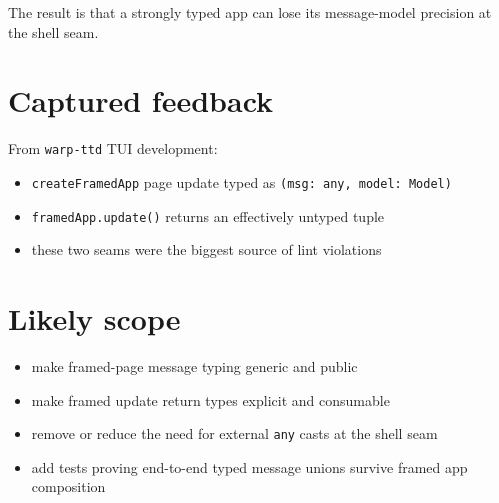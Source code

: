 The result is that a strongly typed app can lose its message-model precision at the shell seam.

\section{Captured feedback}\label{record-120-captured-feedback}

From \texttt{w\allowbreak{}a\allowbreak{}r\allowbreak{}p\allowbreak{}-\allowbreak{}t\allowbreak{}t\allowbreak{}d} TUI development:

\begin{itemize}
\tightlist
\item
  \texttt{c\allowbreak{}r\allowbreak{}e\allowbreak{}a\allowbreak{}t\allowbreak{}e\allowbreak{}F\allowbreak{}r\allowbreak{}a\allowbreak{}m\allowbreak{}e\allowbreak{}d\allowbreak{}A\allowbreak{}p\allowbreak{}p} page update typed as \texttt{(\allowbreak{}m\allowbreak{}s\allowbreak{}g\allowbreak{}:\allowbreak{} \allowbreak{}a\allowbreak{}n\allowbreak{}y\allowbreak{},\allowbreak{} \allowbreak{}m\allowbreak{}o\allowbreak{}d\allowbreak{}e\allowbreak{}l\allowbreak{}:\allowbreak{} \allowbreak{}M\allowbreak{}o\allowbreak{}d\allowbreak{}e\allowbreak{}l\allowbreak{})}
\item
  \texttt{f\allowbreak{}r\allowbreak{}a\allowbreak{}m\allowbreak{}e\allowbreak{}d\allowbreak{}A\allowbreak{}p\allowbreak{}p\allowbreak{}.\allowbreak{}u\allowbreak{}p\allowbreak{}d\allowbreak{}a\allowbreak{}t\allowbreak{}e\allowbreak{}(\allowbreak{})} returns an effectively untyped tuple
\item
  these two seams were the biggest source of lint violations
\end{itemize}

\section{Likely scope}\label{record-120-likely-scope}

\begin{itemize}
\tightlist
\item
  make framed-page message typing generic and public
\item
  make framed update return types explicit and consumable
\item
  remove or reduce the need for external \texttt{a\allowbreak{}n\allowbreak{}y} casts at the shell seam
\item
  add tests proving end-to-end typed message unions survive framed app composition
\end{itemize}

